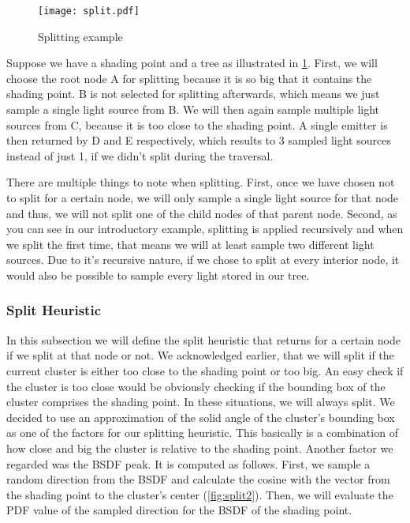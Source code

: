 \begin{figure}
	\begin{center}
		\texttt{[image: split.pdf]}
		\caption{Splitting example}
		\label{fig:split}
	\end{center}
\end{figure}

Suppose we have a shading point and a tree as illustrated in \ref{fig:split}. First, we will choose the root node A for splitting because it is so big that it contains the shading point. B is not selected for splitting afterwards, which means we just sample a single light source from B. We will then again sample multiple light sources from C, because it is too close to the shading point. A single emitter is then returned by D and E respectively, which results to 3 sampled light sources instead of just 1, if we didn't split during the traversal. 

There are multiple things to note when splitting. First, once we have chosen not to split for a certain node, we will only sample a single light source for that node and thus, we will not split one of the child nodes of that parent node. Second, as you can see in our introductory example, splitting is applied recursively and when we split the first time, that means we will at least sample two different light sources. Due to it's recursive nature, if we chose to split at every interior node, it would also be possible to sample every light stored in our tree.

\subsubsection{Split Heuristic}

In this subsection we will define the split heuristic that returns for a certain node if we split at that node or not. We acknowledged earlier, that we will split if the current cluster is either too close to the shading point or too big. An easy check if the cluster is too close would be obviously checking if the bounding box of the cluster comprises the shading point. In these situations, we will always split. We decided to use an approximation of the solid angle of the cluster's bounding box as one of the factors for our splitting heuristic. This basically is a combination of how close and big the cluster is relative to the shading point. Another factor we regarded was the BSDF peak. It is computed as follows. First, we sample a random direction from the BSDF and calculate the cosine with the vector from the shading point to the cluster's center (\ref{fig:split2}). Then, we will evaluate the PDF value of the sampled direction for the BSDF of the shading point.

